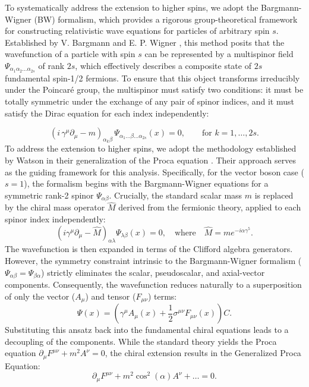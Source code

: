 To systematically address the extension to higher spins, we adopt the Bargmann-Wigner (BW) formalism, which provides a rigorous group-theoretical framework for constructing relativistic wave equations for particles of arbitrary spin $s$. Established by V. Bargmann and E. P. Wigner \cite{bargmann1997a}, this method posits that the wavefunction of a particle with spin $s$ can be represented by a multispinor field $\Psi_{\alpha_1 \alpha_2 \dots \alpha_{2s}}$ of rank $2s$, which effectively describes a composite state of $2s$ fundamental spin-1/2 fermions. To ensure that this object transforms irreducibly under the Poincar\'{e} group, the multispinor must satisfy two conditions: it must be totally symmetric under the exchange of any pair of spinor indices, and it must satisfy the Dirac equation for each index independently:

\begin{equation}
    \left( i\,\gamma^\mu \partial_\mu - m \right)_{\alpha_k \beta}\,
    \Psi_{\alpha_1 \dots \beta \dots \alpha_{2s}}(x)
    = 0,
    \qquad \text{for } k = 1, \dots, 2s .
\end{equation}
To address the extension to higher spins, we adopt the methodology established by Watson in their generalization of the Proca equation \cite{Watson2022}. Their approach serves as the guiding framework for this analysis. Specifically, for the vector boson case ($s=1$), the formalism begins with the Bargmann-Wigner equations for a symmetric rank-2 spinor $\Psi_{\alpha\beta}$. Crucially, the standard scalar mass $m$ is replaced by the chiral mass operator $\hat{M}$ derived from the fermionic theory, applied to each spinor index independently:
\begin{equation}
    (i \gamma^\mu \partial_\mu - \hat{M})_{\alpha \lambda} \Psi_{\lambda \beta}(x) = 0, \quad \text{where} \quad \hat{M} = m e^{-i\alpha\gamma^5}.
\end{equation}
The wavefunction is then expanded in terms of the Clifford algebra generators. However, the symmetry constraint intrinsic to the Bargmann-Wigner formalism ($\Psi_{\alpha\beta} = \Psi_{\beta\alpha}$) strictly eliminates the scalar, pseudoscalar, and axial-vector components. Consequently, the wavefunction reduces naturally to a superposition of only the vector ($A_\mu$) and tensor ($F_{\mu\nu}$) terms:
\begin{equation}
    \Psi(x) = \left( \gamma^\mu A_\mu(x) + \frac{1}{2}\sigma^{\mu\nu} F_{\mu\nu}(x) \right) C.
\end{equation}
Substituting this ansatz back into the fundamental chiral equations leads to a decoupling of the components. While the standard theory yields the Proca equation $\partial_\mu F^{\mu\nu} + m^2 A^\nu = 0$, the chiral extension results in the Generalized Proca Equation:
\begin{equation}
    \partial_\mu F^{\mu\nu} + m^2 \cos^2(\alpha) A^\nu + \dots = 0.
\end{equation}

